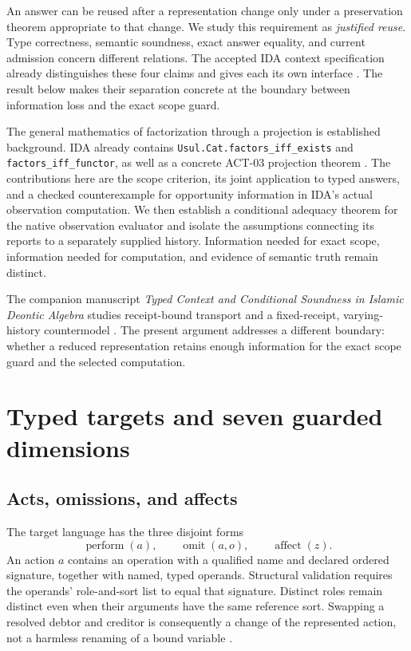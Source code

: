 \documentclass[11pt]{article}
\newcommand{\op}[1]{\operatorname{#1}}
\begin{document}
An answer can be reused after a representation change only under a preservation theorem appropriate to that change. We study this requirement as \emph{justified reuse}. Type correctness, semantic soundness, exact answer equality, and current admission concern different relations. The accepted IDA context specification already distinguishes these four claims and gives each its own interface \cite{design}. The result below makes their separation concrete at the boundary between information loss and the exact scope guard.

The general mathematics of factorization through a projection is established background. IDA already contains \texttt{Usul.\allowbreak{}Cat.\allowbreak{}factors\_\allowbreak{}iff\_\allowbreak{}exists} and \texttt{factors\_iff\_functor}, as well as a concrete ACT-03 projection theorem \cite{factor,projection}. The contributions here are the scope criterion, its joint application to typed answers, and a checked counterexample for opportunity information in IDA's actual observation computation. We then establish a conditional adequacy theorem for the native observation evaluator and isolate the assumptions connecting its reports to a separately supplied history. Information needed for exact scope, information needed for computation, and evidence of semantic truth remain distinct.

The companion manuscript \emph{Typed Context and Conditional Soundness in Islamic Deontic Algebra} studies receipt-bound transport and a fixed-receipt, varying-history countermodel \cite{companion}. The present argument addresses a different boundary: whether a reduced representation retains enough information for the exact scope guard and the selected computation.

\section{Typed targets and seven guarded dimensions}

\subsection{Acts, omissions, and affects}

The target language has the three disjoint forms
\[
 \op{perform}(a),\qquad
 \op{omit}(a,o),\qquad
 \op{affect}(z).
\]
An action \(a\) contains an operation with a qualified name and declared ordered signature, together with named, typed operands. Structural validation requires the operands' role-and-sort list to equal that signature. Distinct roles remain distinct even when their arguments have the same reference sort. Swapping a resolved debtor and creditor is consequently a change of the represented action, not a harmless renaming of a bound variable \cite{core,substitution}.
\end{document}
